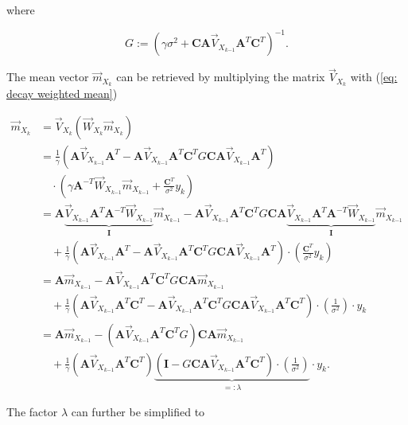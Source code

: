 \documentclass[11pt,a4paper,twoside]{report}
\newcommand{\messF}[3]{\overrightarrow{#1}_{{#2}_{k{#3}}}}
\newcommand{\mat}[1]{\mathbf{#1}}
\begin{document}
\noindent where

\begin{equation*}
	G := \left(\gamma \sigma^2 + \mat{C} \mat{A}\messF{V}{X}{-1} \mat{A}^T\mat{C}^T \right)^{-1}.
\end{equation*}

The mean vector $\messF{m}{X}{}$ can be retrieved by multiplying the matrix $\messF{V}{X}{}$ with (\ref{eq: decay weighted mean})

\begin{align}
	\label{eq: update rule, mean vector}
	\messF{m}{X}{} &= \messF{V}{X}{} \left( \messF{W}{X}{}\messF{m}{X}{} \right) \\
	&= \frac{1}{\gamma} \left(\mat{A}\messF{V}{X}{-1}\mat{A}^T - \mat{A}\messF{V}{X}{-1}\mat{A}^T \mat{C}^T G\mat{C}\mat{A}\messF{V}{X}{-1}\mat{A}^T\right) \\
	&\nonumber \quad \cdot \left(\gamma \mat{A}^{-T}\messF{W}{X}{-1}\messF{m}{X}{-1} + \frac{\mat{C}^T}{\sigma^2}y_k \right) \\
	&= \mat{A} \underbrace{\messF{V}{X}{-1}\mat{A}^T\mat{A}^{-T}\messF{W}{X}{-1}}_{\mat{I}} \messF{m}{X}{-1} - \mat{A}\messF{V}{X}{-1}\mat{A}^T \mat{C}^T G\mat{C}\mat{A}\underbrace{\messF{V}{X}{-1}\mat{A}^T\mat{A}^{-T}\messF{W}{X}{-1}}_{\mat{I}}\messF{m}{X}{-1} \\
	&\nonumber \quad + \frac{1}{\gamma} \left(\mat{A}\messF{V}{X}{-1}\mat{A}^T - \mat{A}\messF{V}{X}{-1}\mat{A}^T \mat{C}^T G\mat{C}\mat{A}\messF{V}{X}{-1}\mat{A}^T\right) \cdot \left( \frac{\mat{C}^T}{\sigma^2}y_k \right) \\
	&= \mat{A} \messF{m}{X}{-1} - \mat{A}\messF{V}{X}{-1}\mat{A}^T \mat{C}^T G\mat{C}\mat{A}\messF{m}{X}{-1} \\
	&\nonumber \quad + \frac{1}{\gamma} \left(\mat{A}\messF{V}{X}{-1}\mat{A}^T\mat{C}^T - \mat{A}\messF{V}{X}{-1}\mat{A}^T \mat{C}^T G\mat{C}\mat{A}\messF{V}{X}{-1}\mat{A}^T\mat{C}^T\right) \cdot \left(\frac{1}{\sigma^2}\right) \cdot y_k \\
	&= \mat{A} \messF{m}{X}{-1} - \left(\mat{A}\messF{V}{X}{-1}\mat{A}^T \mat{C}^T G\right)\mat{C}\mat{A}\messF{m}{X}{-1} \\
	&\nonumber \quad + \frac{1}{\gamma} \left(\mat{A}\messF{V}{X}{-1}\mat{A}^T\mat{C}^T\right) \underbrace{\left(\mat{I} - G\mat{C}\mat{A}\messF{V}{X}{-1}\mat{A}^T\mat{C}^T\right) \cdot \left(\frac{1}{\sigma^2}\right)}_{=:\lambda} \cdot y_k.
\end{align}

The factor $\lambda$ can further be simplified to
\end{document}
